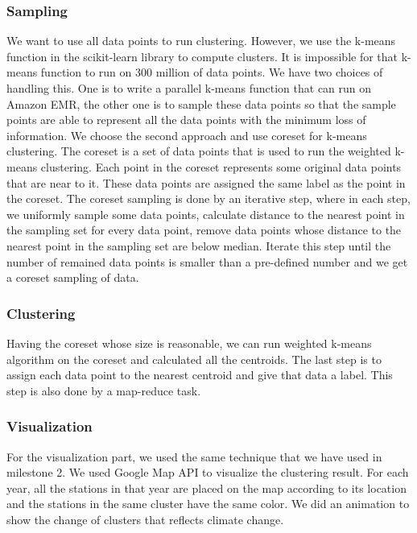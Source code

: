 \subsubsection{Sampling}
We want to use all data points to run clustering. However, we use the k-means function in the scikit-learn library to compute clusters. It is impossible for that k-means function to run on 300 million of data points. We have two choices of handling this. One is to write a parallel k-means function that can run on Amazon EMR, the other one is to sample these data points so that the sample points are able to represent all the data points with the minimum loss of information. We choose the second approach and use coreset for k-means clustering. The coreset is a set of data points that is used to run the weighted k-means clustering. Each point in the coreset represents some original data points that are near to it. These data points are assigned the same label as the point in the coreset. The coreset sampling is done by an iterative step, where in each step, we uniformly sample some data points, calculate distance to the nearest point in the sampling set for every data point, remove data points whose distance to the nearest point in the sampling set are below median. Iterate this step until the number of remained data points is smaller than a pre-defined number and we get a coreset sampling of data.

\subsubsection{Clustering}
Having the coreset whose size is reasonable, we can run weighted k-means algorithm on the coreset and calculated all the centroids. The last step is to assign each data point to the nearest centroid and give that data a label. This step is also done by a map-reduce task.

\subsubsection{Visualization}
For the visualization part, we used the same technique that we have used in milestone 2. We used Google Map API to visualize the clustering result. For each year, all the stations in that year are placed on the map according to its location and the stations in the same cluster have the same color. We did an animation to show the change of clusters that reflects climate change.

